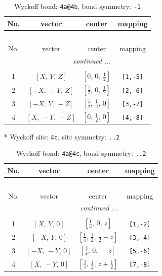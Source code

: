 \documentclass[fleqn,8pt]{jsarticle}
\begin{document}
\begin{longtable}{cccc}
\caption{Wyckoff bond: {\tt 4a@4b}, bond symmetry: {\tt -1}}
 \\
 \hline \hline
No. & vector & center & mapping \\ \hline \endfirsthead

\multicolumn{3}{l}{\tablename\ \thetable{}} \\
 \hline \hline
No. & vector & center & mapping \\ \hline \endhead

 \hline \hline
\multicolumn{3}{r}{\footnotesize\it continued ...} \\ \endfoot

 \hline \hline
\multicolumn{3}{r}{} \\ \endlastfoot

1 & $\left[ X,\, Y,\, Z \right]$ & $\left[ 0,\, 0,\, \frac{1}{2} \right]$ & {\tt [1,-5]} \\ \hline
2 & $\left[ - X,\, - Y,\, Z \right]$ & $\left[ \frac{1}{2},\, 0,\, \frac{1}{2} \right]$ & {\tt [2,-6]} \\ \hline
3 & $\left[ - X,\, Y,\, - Z \right]$ & $\left[ \frac{1}{2},\, \frac{1}{2},\, 0 \right]$ & {\tt [3,-7]} \\ \hline
4 & $\left[ X,\, - Y,\, - Z \right]$ & $\left[ 0,\, \frac{1}{2},\, 0 \right]$ & {\tt [4,-8]} \\
\end{longtable}
* Wyckoff site: {\tt 4c}, site symmetry: {\tt ..2}
\renewcommand{\arraystretch}{1.2}
\begin{longtable}{cccc}
\caption{Wyckoff bond: {\tt 4a@4c}, bond symmetry: {\tt ..2}}
 \\
 \hline \hline
No. & vector & center & mapping \\ \hline \endfirsthead

\multicolumn{3}{l}{\tablename\ \thetable{}} \\
 \hline \hline
No. & vector & center & mapping \\ \hline \endhead

 \hline \hline
\multicolumn{3}{r}{\footnotesize\it continued ...} \\ \endfoot

 \hline \hline
\multicolumn{3}{r}{} \\ \endlastfoot

1 & $\left[ X,\, Y,\, 0 \right]$ & $\left[ \frac{1}{4},\, 0,\, z \right]$ & {\tt [1,-2]} \\ \hline
2 & $\left[ - X,\, Y,\, 0 \right]$ & $\left[ \frac{1}{4},\, \frac{1}{2},\, \frac{1}{2} - z \right]$ & {\tt [3,-4]} \\ \hline
3 & $\left[ - X,\, - Y,\, 0 \right]$ & $\left[ \frac{3}{4},\, 0,\, - z \right]$ & {\tt [5,-6]} \\ \hline
4 & $\left[ X,\, - Y,\, 0 \right]$ & $\left[ \frac{3}{4},\, \frac{1}{2},\, z + \frac{1}{2} \right]$ & {\tt [7,-8]} \\
\end{longtable}
\end{document}
